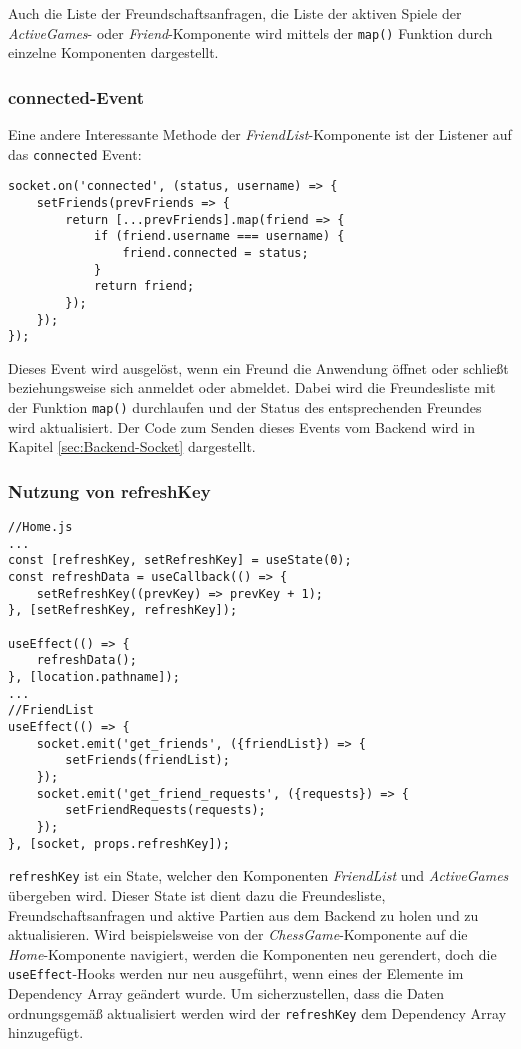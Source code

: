 Auch die Liste der Freundschaftsanfragen, die Liste der aktiven Spiele der \textit{ActiveGames}- oder \textit{Friend}-Komponente wird mittels der \verb|map()| Funktion durch einzelne Komponenten dargestellt.

\subsubsection{connected-Event}
\label{sec:connected}
Eine andere Interessante Methode der \textit{FriendList}-Komponente ist der Listener auf das \verb|connected| Event:

\begin{lstlisting}[style=codeStyle, caption={Der connected Eventlistener der \textit{FriendList}-Komponente}, label={lst:routing-Middlewares}]
socket.on('connected', (status, username) => {
    setFriends(prevFriends => {
        return [...prevFriends].map(friend => {
            if (friend.username === username) {
                friend.connected = status;
            }
            return friend;
        });
    });
});
\end{lstlisting}

Dieses Event wird ausgelöst, wenn ein Freund die Anwendung öffnet oder schließt beziehungsweise sich anmeldet oder abmeldet. Dabei wird die Freundesliste mit der Funktion \verb|map()| durchlaufen und der Status des entsprechenden Freundes wird aktualisiert. Der Code zum Senden dieses Events vom Backend wird in Kapitel \ref{sec:Backend-Socket} dargestellt.


\subsubsection{Nutzung von refreshKey}
\begin{lstlisting}[style=codeStyle, caption={Darstellung der Freundesliste in \textit{FriendList}}, label={lst:FriendList}]
//Home.js
...
const [refreshKey, setRefreshKey] = useState(0);
const refreshData = useCallback(() => {
    setRefreshKey((prevKey) => prevKey + 1);
}, [setRefreshKey, refreshKey]);

useEffect(() => {
    refreshData();
}, [location.pathname]);
...
//FriendList
useEffect(() => {
    socket.emit('get_friends', ({friendList}) => {
        setFriends(friendList);
    });
    socket.emit('get_friend_requests', ({requests}) => {
        setFriendRequests(requests);
    });
}, [socket, props.refreshKey]);
\end{lstlisting}

\verb|refreshKey| ist ein State, welcher den Komponenten \textit{FriendList} und \textit{ActiveGames} übergeben wird. Dieser State ist dient dazu die Freundesliste, Freundschaftsanfragen und aktive Partien aus dem Backend zu holen und zu aktualisieren. Wird beispielsweise von der \textit{ChessGame}-Komponente auf die \textit{Home}-Komponente navigiert, werden die Komponenten neu gerendert, doch die \verb|useEffect|-Hooks werden nur neu ausgeführt, wenn eines der Elemente im Dependency Array geändert wurde. Um sicherzustellen, dass die Daten ordnungsgemäß aktualisiert werden wird der \verb|refreshKey| dem Dependency Array hinzugefügt.


